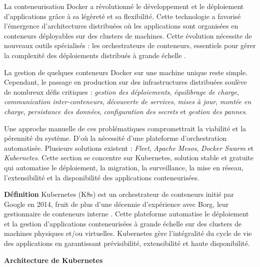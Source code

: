 La conteneurisation Docker a révolutionné le développement et le déploiement d'applications grâce à sa légèreté et sa flexibilité. Cette technologie a favorisé l'émergence d'architectures distribuées où les applications sont organisées en conteneurs déployables sur des clusters de machines.
Cette évolution nécessite de nouveaux outils spécialisés : les orchestrateurs de conteneurs, essentiels pour gérer la complexité des déploiements distribués à grande échelle \cite{7036275}.

La gestion de quelques conteneurs Docker sur une machine unique reste simple. Cependant, le passage en production sur des infrastructures distribuées soulève de nombreux défis critiques : \textit{gestion des déploiements}, \textit{équilibrage de charge}, \textit{communication inter-conteneurs}, \textit{découverte de services}, \textit{mises à jour}, \textit{montée en charge}, \textit{persistance des données}, \textit{configuration des secrets} et \textit{gestion des pannes}.

Une approche manuelle de ces problématiques compromettrait la viabilité et la pérennité du système. D'où la nécessité d'une plateforme d'orchestration automatisée.
Plusieurs solutions existent \cite{smith2017docker}: \textit{Fleet}, \textit{Apache Mesos}, \textit{Docker Swarm} et \textit{Kubernetes}. Cette section se concentre sur Kubernetes, solution stable et gratuite qui automatise le déploiement, la migration, la surveillance, la mise en réseau, l'extensibilité et la disponibilité des applications conteneurisées.

\textbf{Définition}
Kubernetes (K8s) est un orchestrateur de conteneurs initié par Google en 2014, fruit de plus d'une décennie d'expérience avec Borg, leur gestionnaire de conteneurs interne \cite{7036275}. 
Cette plateforme automatise le déploiement et la gestion d'applications conteneurisées à grande échelle sur des clusters de machines physiques et/ou virtuelles. Kubernetes gère l'intégralité du cycle de vie des applications en garantissant prévisibilité, extensibilité et haute disponibilité.

\textbf{Architecture de Kubernetes}

